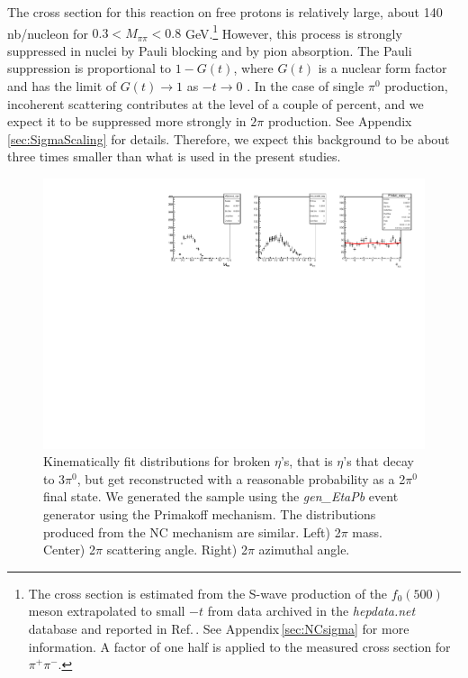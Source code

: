 The cross section for this reaction on free protons is relatively
large, about 140 nb/nucleon for $0.3 < M_{\pi\pi} < 0.8$
GeV.\footnote{The cross section is estimated from the S-wave
  production of the $f_0(500)$ meson extrapolated to small $-t$ from
  data archived in the {\em hepdata.net} database and reported in
  Ref.\,\cite{Battaglieri:2009aa}. See Appendix\,\ref{sec:NCsigma} for
  more information. A factor of one half is applied to the measured
  cross section for $\pi^+\pi^-$.} However, this process is strongly
suppressed in nuclei by Pauli blocking and by pion absorption. The
Pauli suppression is proportional to $1-G(t)$, where $G(t)$ is a
nuclear form factor and has the limit of $G(t)\to1$ as $-t\to0$
\cite{Gevorkyan:2009ge,primex_inc}. In the case of single $\pi^0$
production, incoherent scattering contributes at the level of a couple
of percent, and we expect it to be suppressed more strongly in $2\pi$
production. See Appendix\,\ref{sec:SigmaScaling} for
details. Therefore, we expect this background to be about three times
smaller than what is used in the present studies.

\begin{figure}[tbp]
\begin{center}
\includegraphics[width=16cm,clip=true]{figures/BrokenEtasPrim.pdf}
\caption{Kinematically fit distributions for broken $\eta$'s, that is $\eta$'s that decay to 3$\pi^0$, but get reconstructed with a reasonable probability as a 2$\pi^0$ final state.
We generated the sample using the {\em gen\_EtaPb} event generator using the Primakoff mechanism. The distributions produced from the NC mechanism are similar. 
Left) 2$\pi$ mass. Center) 2$\pi$ scattering angle. Right) 2$\pi$ azimuthal angle.
\label{fig:eta}}
\end{center} 
\end{figure}



